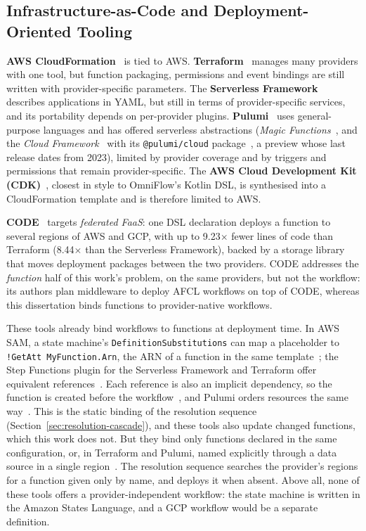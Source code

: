 \subsection{Infrastructure-as-Code and Deployment-Oriented Tooling}

\textbf{AWS CloudFormation}~\cite{awsCloudFormation} is tied to AWS.
\textbf{Terraform}~\cite{terraform} manages many providers with one tool, but function packaging,
permissions and event bindings are still written with provider-specific parameters. The
\textbf{Serverless Framework}~\cite{serverlessFramework} describes applications in YAML, but still
in terms of provider-specific services, and its portability depends on per-provider plugins.
\textbf{Pulumi}~\cite{pulumi} uses general-purpose languages and has offered serverless
abstractions (\textit{Magic Functions}~\cite{pulumiMagicFunctions}, and the \textit{Cloud
Framework}~\cite{pulumiCloudFramework} with its \texttt{@pulumi/cloud}
package~\cite{pulumiCloudPkg}, a preview whose last release dates from 2023), limited by provider
coverage and by triggers and permissions that remain provider-specific. The \textbf{AWS
Cloud Development Kit (CDK)}~\cite{awsCdk}, closest in style to OmniFlow's Kotlin DSL, is
synthesised into a CloudFormation template and is therefore limited to AWS.

\textbf{CODE}~\cite{ristov2024code} targets \emph{federated FaaS}: one DSL declaration deploys a
function to several regions of AWS and GCP, with up to 9.23$\times$ fewer lines of code than
Terraform (8.44$\times$ than the Serverless Framework), backed by a storage library that moves
deployment packages between the two providers. CODE addresses the \textit{function} half of this
work's problem, on the same providers, but not the workflow: its authors plan middleware to deploy
AFCL workflows on top of CODE, whereas this dissertation binds functions to provider-native
workflows.

These tools already bind workflows to functions at deployment time. In AWS SAM, a state machine's
\texttt{DefinitionSubstitutions} can map a placeholder to \texttt{!GetAtt MyFunction.Arn}, the ARN
of a function in the same template~\cite{awsSamStateMachine}; the Step Functions plugin for the
Serverless Framework and Terraform offer equivalent
references~\cite{serverlessStepFunctionsPlugin,terraformSfnStateMachine}. Each reference is also an
implicit dependency, so the function is created before the
workflow~\cite{awsCloudFormationDependsOn,terraformReferences}, and Pulumi orders resources the same
way~\cite{pulumiInputsOutputs}. This is the static binding of the resolution sequence
(Section~\ref{sec:resolution-cascade}), and these tools also update changed functions, which this
work does not. But they bind only functions declared in the same configuration, or, in Terraform
and Pulumi, named explicitly through a data source in a single
region~\cite{terraformLambdaDataSource,pulumiLambdaGetFunction}. The resolution sequence searches the
provider's regions for a function given only by name, and deploys it when absent. Above all, none
of these tools offers a provider-independent workflow: the state machine is written in the Amazon
States Language, and a GCP workflow would be a separate definition.

